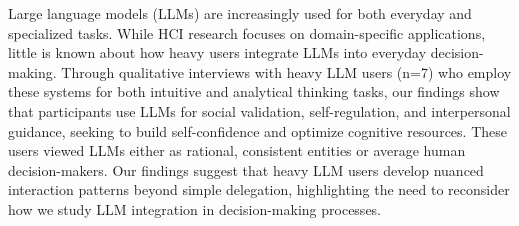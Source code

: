 Large language models (LLMs) are increasingly used for both everyday and specialized tasks. While HCI research focuses on domain-specific applications, little is known about how heavy users integrate LLMs into everyday decision-making. Through qualitative interviews with heavy LLM users (n=7) who employ these systems for both intuitive and analytical thinking tasks, our findings show that participants use LLMs for social validation, self-regulation, and interpersonal guidance, seeking to build self-confidence and optimize cognitive resources. These users viewed LLMs either as rational, consistent entities or average human decision-makers. Our findings suggest that heavy LLM users develop nuanced interaction patterns beyond simple delegation, highlighting the need to reconsider how we study LLM integration in decision-making processes.
